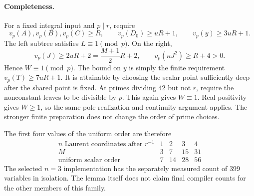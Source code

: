 \paragraph{Completeness.}
For a fixed integral input and $p\mid r$, require
\[
 v_p(A),v_p(B),v_p(C)\ge R,\qquad
 v_p(D_0)\ge uR+1,\qquad v_p(y)\ge3uR+1.
\]
The left subtree satisfies $L\equiv1\pmod p$. On the right,
\[
 v_p(J)\ge2uR+2=\frac{M+1}{2}R+2,
 \qquad v_p(\kappa J^2)\ge R+4>0.
\]
Hence $W\equiv1\pmod p$. The bound on $y$ is simply the finite
requirement $v_p(T)\ge7uR+1$. It is attainable by choosing the scalar
point sufficiently deep after the shared point is fixed. At primes
dividing 42 but not $r$, require the nonconstant leaves to be divisible
by $p$. This again gives $W\equiv1$. Real positivity gives $W\ge1$,
so the same pole realization and continuity argument applies. The
stronger finite preparation does not change the order of prime choices.

The first four values of the uniform order are therefore
\[
\begin{array}{c|rrrr}
 n\text{ Laurent coordinates after }r^{-1}&1&2&3&4\\
 M&3&7&15&31\\
 \text{uniform scalar order}&7&14&28&56
\end{array}
\]
The selected $n=3$ implementation has the separately measured count
of 399 variables in isolation. The lemma itself does not claim final
compiler counts for the other members of this family.
